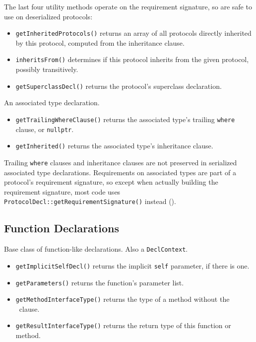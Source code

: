 \documentclass[../generics]{subfiles}
\begin{document}
The last four utility methods operate on the requirement signature, so are safe to use on deserialized protocols:
\begin{itemize}
\item \texttt{getInheritedProtocols()} returns an array of all protocols directly inherited by this protocol, computed from the inheritance clause.
\item \texttt{inheritsFrom()} determines if this protocol inherits from the given protocol, possibly transitively.
\item \texttt{getSuperclassDecl()} returns the protocol's superclass declaration.
\end{itemize}

An associated type declaration.
\begin{itemize}
\item \texttt{getTrailingWhereClause()} returns the associated type's trailing \texttt{where} clause, or \texttt{nullptr}.
\item \texttt{getInherited()} returns the associated type's inheritance clause.
\end{itemize}

Trailing \texttt{where} clauses and inheritance clauses are not preserved in serialized associated type declarations. Requirements on associated types are part of a protocol's requirement signature, so except when actually building the requirement signature, most code uses \texttt{ProtocolDecl::getRequirementSignature()} instead ().

\subsection*{Function Declarations}

Base class of function-like declarations. Also a \texttt{DeclContext}.
\begin{itemize}
\item \texttt{getImplicitSelfDecl()} returns the implicit \texttt{self} parameter, if there is one.
\item \texttt{getParameters()} returns the function's parameter list.
\item \texttt{getMethodInterfaceType()} returns the type of a method without the \tSelf\ clause.
\item \texttt{getResultInterfaceType()} returns the return type of this function or method.
\end{itemize}
\end{document}
